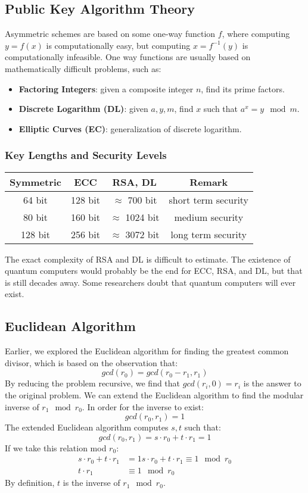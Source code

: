 \documentclass{math}
\begin{document}
\subsection*{Public Key Algorithm Theory}
Asymmetric schemes are based on some one-way function \( f \), where computing
\( y = f(x) \) is computationally easy, but computing \( x = f^{-1}(y) \) is
computationally infeasible. One way functions are usually based on
mathematically difficult problems, such as:
\begin{itemize}
  \item \textbf{Factoring Integers}: given a composite integer \( n \), find its
  prime factors.
  \item \textbf{Discrete Logarithm (DL)}: given \( a,y,m \), find \( x \) such
  that \( a^x = y\mod m \).
  \item \textbf{Elliptic Curves (EC)}: generalization of discrete logarithm.
\end{itemize}

\subsubsection*{Key Lengths and Security Levels}
\begin{center}
  \begin{tabular}{|c|c|c|c|}
    \hline
    Symmetric & ECC & RSA, DL & Remark \\
    \hline
    64 bit & 128 bit & \( \approx \) 700 bit & short term security \\
    \hline
    80 bit & 160 bit & \( \approx \) 1024 bit & medium security \\
    \hline
    128 bit & 256 bit & \( \approx \) 3072 bit &  long term security \\
    \hline
  \end{tabular}
\end{center}
The exact complexity of RSA and DL is difficult to estimate. The existence of
quantum computers would probably be the end for ECC, RSA, and DL, but that is
still decades away. Some researchers doubt that quantum computers will ever
exist.

\subsection*{Euclidean Algorithm}
Earlier, we explored the Euclidean algorithm for finding the greatest common
divisor, which is based on the observation that:
\[ gcd(r_0) = gcd(r_0-r_1,r_1) \]
By reducing the problem recursive, we find that \( gcd(r_i,0) = r_i \) is the
answer to the original problem. We can extend the Euclidean algorithm to find
the modular inverse of \( r_1 \mod r_0 \). In order for the inverse to exist:
\[ gcd(r_0,r_1) = 1 \]
The extended Euclidean algorithm computes \( s,t \) such that:
\[ gcd(r_0,r_1) = s\cdot r_0+t\cdot r_1 = 1 \]
If we take this relation mod \( r_0 \):
\begin{align*}
  s\cdot r_0+t\cdot r_1 &= 1
  s\cdot r_0+t\cdot r_1 \equiv 1\mod r_0 \\
  t\cdot r_1 &\equiv 1\mod r_0
\end{align*}
By definition, \( t \) is the inverse of \( r_1 \mod r_0 \).
\end{document}
